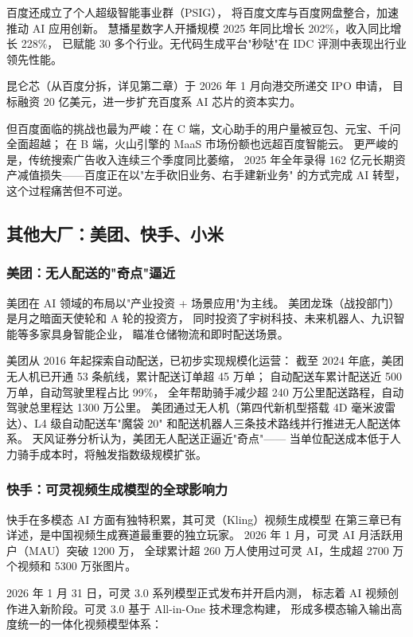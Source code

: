 百度还成立了个人超级智能事业群（PSIG），
将百度文库与百度网盘整合，加速推动 AI 应用创新。
慧播星数字人开播规模 2025 年同比增长 202\%，收入同比增长 228\%，
已赋能 30 多个行业。无代码生成平台"秒哒"在 IDC 评测中表现出行业领先性能。

昆仑芯（从百度分拆，详见第二章）于 2026 年 1 月向港交所递交 IPO 申请，
目标融资 20 亿美元，进一步扩充百度系 AI 芯片的资本实力。

但百度面临的挑战也最为严峻：在 C 端，文心助手的用户量被豆包、元宝、千问全面超越；
在 B 端，火山引擎的 MaaS 市场份额也远超百度智能云。
更严峻的是，传统搜索广告收入连续三个季度同比萎缩，
2025 年全年录得 162 亿元长期资产减值损失——百度正在以"左手砍旧业务、右手建新业务"
的方式完成 AI 转型，这个过程痛苦但不可逆。

\subsection{其他大厂：美团、快手、小米}
\label{subsec:china-other-bigtech}

\subsubsection{美团：无人配送的"奇点"逼近}

美团在 AI 领域的布局以"产业投资 + 场景应用"为主线。
美团龙珠（战投部门）是月之暗面天使轮和 A 轮的投资方，
同时投资了宇树科技、未来机器人、九识智能等多家具身智能企业，
瞄准仓储物流和即时配送场景。

美团从 2016 年起探索自动配送，已初步实现规模化运营：
截至 2024 年底，美团无人机已开通 53 条航线，累计配送订单超 45 万单；
自动配送车累计配送近 500 万单，自动驾驶里程占比 99\%，
全年帮助骑手减少超 240 万公里配送路程，自动驾驶总里程达 1300 万公里。
美团通过无人机（第四代新机型搭载 4D 毫米波雷达）、L4 级自动配送车"魔袋 20"
和配送机器人三条技术路线并行推进无人配送体系。
天风证券分析认为，美团无人配送正逼近"奇点"——
当单位配送成本低于人力骑手成本时，将触发指数级规模扩张。

\subsubsection{快手：可灵视频生成模型的全球影响力}

快手在多模态 AI 方面有独特积累，其可灵（Kling）视频生成模型
在第三章已有详述，是中国视频生成赛道最重要的独立玩家。
2026 年 1 月，可灵 AI 月活跃用户（MAU）突破 1200 万，
全球累计超 260 万人使用过可灵 AI，生成超 2700 万个视频和 5300 万张图片。

2026 年 1 月 31 日，可灵 3.0 系列模型正式发布并开启内测，
标志着 AI 视频创作进入新阶段。可灵 3.0 基于 All-in-One 技术理念构建，
形成多模态输入输出高度统一的一体化视频模型体系：

